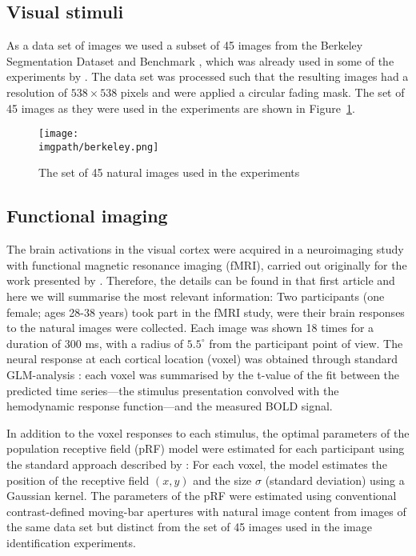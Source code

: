 {\subsection{Visual stimuli}
As a data set of images we used a subset of 45 images from the Berkeley Segmentation Dataset and Benchmark \citep{martin2001berkeley}, which was already used in some of the experiments by \citep{zuiderbaan2017imageidentification}. The data set was processed such that the resulting images had a resolution of $538\times538$ pixels and were applied a circular fading mask. The set of 45 images as they were used in the experiments are shown in Figure~\ref{fig:imageid-berkely}.

\begin{figure}[htb]
  \begin{center}
    \texttt{[image: \\imgpath/berkeley.png]}
  \end{center}
  \caption{The set of 45 natural images used in the experiments}
\label{fig:imageid-berkely}
\end{figure}

\subsection{Functional imaging}
\label{sec:imageid-functional_imaging}
The brain activations in the visual cortex were acquired in a neuroimaging study with functional magnetic resonance imaging (fMRI), carried out originally for the work presented by \citet{zuiderbaan2017imageidentification}. Therefore, the details can be found in that first article and here we will summarise the most relevant information: Two participants (one female; ages 28-38 years) took part in the fMRI study, were their brain responses to the natural images were collected. Each image was shown 18 times for a duration of 300 ms, with a radius of $5.5^{\circ}$ from the participant point of view. The neural response at each cortical location (voxel) was obtained through standard GLM-analysis \citep{friston1995fmrianalysis}: each voxel was summarised by the t-value of the fit between the predicted time series---the stimulus presentation convolved with the hemodynamic response function---and the measured BOLD signal.

In addition to the voxel responses to each stimulus, the optimal parameters of the population receptive field (pRF) model were estimated for each participant using the standard approach described by \citet{dumoulin2008prf}: For each voxel, the model estimates the position of the receptive field $(x, y)$ and the size $\sigma$ (standard deviation) using a Gaussian kernel. The parameters of the pRF were estimated using conventional contrast-defined moving-bar apertures with natural image content from images of the same data set but distinct from the set of 45 images used in the image identification experiments.

}
